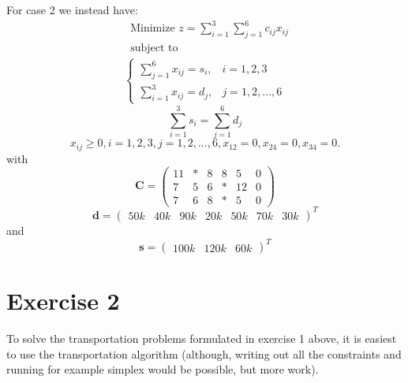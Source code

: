 \documentclass{article}
\begin{document}
  \noindent
  For case 2 we instead have:
   \begin{align*}
  & \text{Minimize } z = \sum_{i=1}^{3}\sum_{j=1}^6 c_{ij}x_{ij} \\
  & \text{subject to}
    \label{eq17}
  \end{align*}
  \begin{align}
    \begin{cases}
      \sum_{j=1}^{6} x_{ij} = s_{i}, & i = 1, 2, 3 \\
      \sum_{i=1}^{3} x_{ij} = d_{j}, & j = 1, 2, ..., 6
    \end{cases}
  \end{align}
  \begin{equation}
    \sum_{i=1}^{3} s_{i} = \sum_{j=1}^6 d_{j}
    \label{eq19}
  \end{equation}
  \begin{equation}
    x_{ij} \geq 0, i = 1, 2, 3, j = 1, 2, ..., 6, x_{12} = 0, x_{24} = 0, x_{34} = 0.
    \label{eq20}
  \end{equation}
  with
  \begin{equation}
    \mathbf{C} =
    \begin{pmatrix}
      11 & * & 8 & 8  & 5  & 0\\
      7  & 5 & 6 & *  & 12 & 0\\
      7  & 6 & 8 & *  & 5  & 0
    \end{pmatrix}
    \label{eq21}
  \end{equation}
  \begin{equation}
    \mathbf{d} =
    \begin{pmatrix}
      50k & 40k & 90k & 20k & 50k & 70k & 30k
    \end{pmatrix}^T
    \label{eq22}
  \end{equation}
  and
  \begin{equation}
    \mathbf{s} =
    \begin{pmatrix}
      100k & 120k & 60k
    \end{pmatrix}^T
    \label{eq23}
  \end{equation}

  \section*{Exercise 2}
  To solve the transportation problems formulated in exercise 1 above, it is
  easiest to use the transportation algorithm (although, writing out all the
  constraints and running for example simplex would be possible, but more work).
\end{document}

